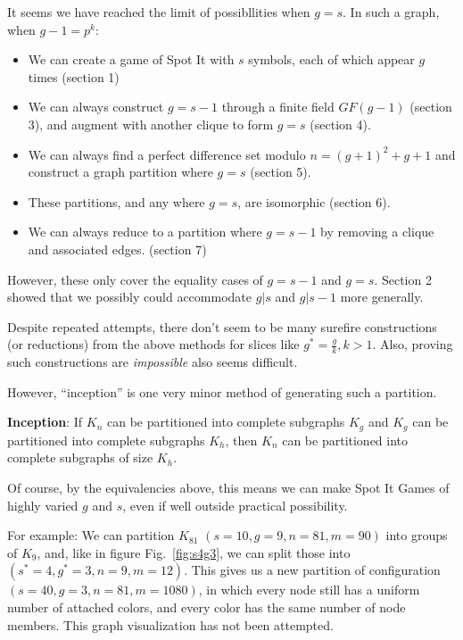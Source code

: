 \documentclass[11pt, oneside]{article} 	%
\begin{document}
It seems we have reached the limit of possibllities when $g=s$. In such a graph, when $g-1 = p^k$:
\begin{itemize}
\item We can create a game of Spot It with $s$ symbols, each of which appear $g$ times (section 1)
\item We can always construct $g=s-1$ through a finite field $GF(g-1)$ (section 3), and augment with another clique to form $g=s$ (section 4).
\item We can always find a perfect difference set modulo $n = (g+1)^2+g+1$ and construct a graph partition where $g=s$ (section 5).
\item These partitions, and any where $g=s$, are isomorphic (section 6).
\item We can always reduce to a partition where $g=s-1$ by removing a clique and associated edges. (section 7)
\end{itemize}

However, these only cover the equality cases of $g=s-1$ and $g=s$. Section 2 showed that we possibly could accommodate $g | s$ and $g | s-1$ more generally.

Despite repeated attempts, there don't seem to be many surefire constructions (or reductions) from the above methods for slices like $g^* = \frac{g}{k}, k > 1$. Also, proving such constructions are \emph{impossible} also seems difficult.

However, ``inception'' is one very minor method of generating such a partition. 

\begin{framed}
\textbf{Inception}: If $K_n$ can be partitioned into complete subgraphs $K_g$ and $K_g$ can be partitioned into complete subgraphs $K_h$, then $K_n$ can be partitioned into complete subgraphs of size $K_h$. 
\end{framed}

Of course, by the equivalencies above, this means we can make Spot It Games of highly varied $g$ and $s$, even if well outside practical possibility.

For example: We can partition $K_{81}$ $(s=10, g=9, n=81,m=90)$ into groups of $K_9$, and, like in figure Fig.~\ref{fig:s4g3}, we can split those into $(s^*=4, g^*=3, n=9,m=12)$. This gives us a new partition of configuration $(s=40,g=3,n=81,m=1080)$, in which every node still has a uniform number of attached colors, and every color has the same number of node members. This graph visualization has not been attempted.
\end{document}
